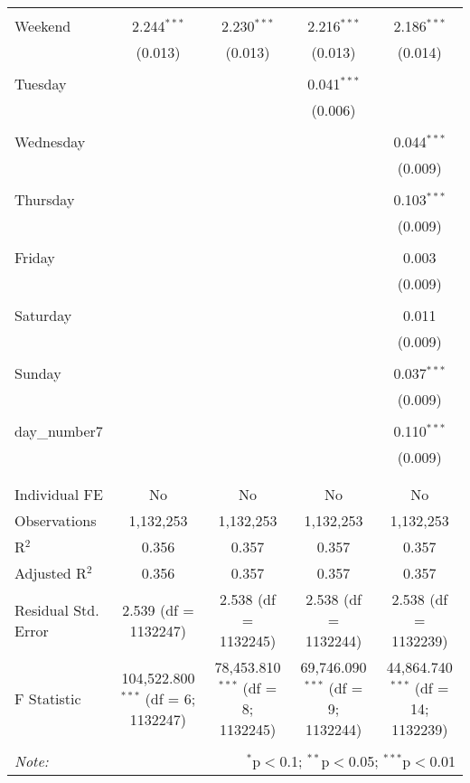 \documentclass[
]{article}
\begin{document}
\begin{table}[!htbp]
{\begin{tabular}{@{\extracolsep{5pt}}lcccc}
  & & & & \\ 
 Weekend & 2.244$^{***}$ & 2.230$^{***}$ & 2.216$^{***}$ & 2.186$^{***}$ \\ 
  & (0.013) & (0.013) & (0.013) & (0.014) \\ 
  & & & & \\ 
 Tuesday &  &  & 0.041$^{***}$ &  \\ 
  &  &  & (0.006) &  \\ 
  & & & & \\ 
 Wednesday &  &  &  & 0.044$^{***}$ \\ 
  &  &  &  & (0.009) \\ 
  & & & & \\ 
 Thursday &  &  &  & 0.103$^{***}$ \\ 
  &  &  &  & (0.009) \\ 
  & & & & \\ 
 Friday &  &  &  & 0.003 \\ 
  &  &  &  & (0.009) \\ 
  & & & & \\ 
 Saturday &  &  &  & 0.011 \\ 
  &  &  &  & (0.009) \\ 
  & & & & \\ 
 Sunday &  &  &  & 0.037$^{***}$ \\ 
  &  &  &  & (0.009) \\ 
  & & & & \\ 
 day\_number7 &  &  &  & 0.110$^{***}$ \\ 
  &  &  &  & (0.009) \\ 
  & & & & \\ 
\hline \\[-1.8ex] 
Individual FE & No & No & No & No \\ 
Observations & 1,132,253 & 1,132,253 & 1,132,253 & 1,132,253 \\ 
R$^{2}$ & 0.356 & 0.357 & 0.357 & 0.357 \\ 
Adjusted R$^{2}$ & 0.356 & 0.357 & 0.357 & 0.357 \\ 
Residual Std. Error & 2.539 (df = 1132247) & 2.538 (df = 1132245) & 2.538 (df = 1132244) & 2.538 (df = 1132239) \\ 
F Statistic & 104,522.800$^{***}$ (df = 6; 1132247) & 78,453.810$^{***}$ (df = 8; 1132245) & 69,746.090$^{***}$ (df = 9; 1132244) & 44,864.740$^{***}$ (df = 14; 1132239) \\ 
\hline 
\hline \\[-1.8ex] 
\textit{Note:}  & \multicolumn{4}{r}{$^{*}$p$<$0.1; $^{**}$p$<$0.05; $^{***}$p$<$0.01} \\ 
\end{tabular}
} 
\end{table} 
\newpage
\end{document}
